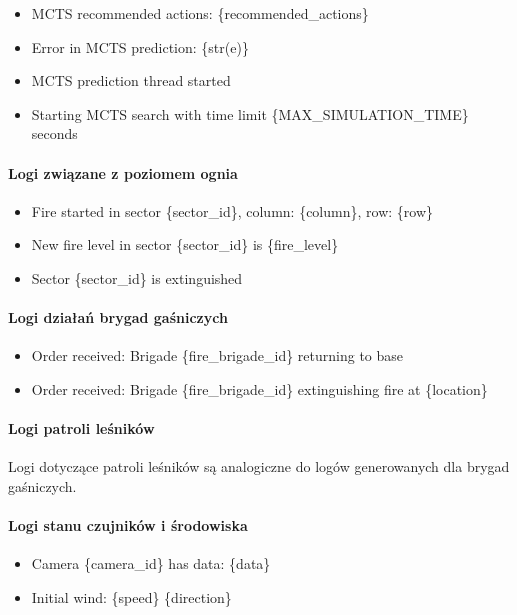 \documentclass[11pt,a4paper]{article}
\begin{document}
\begin{itemize}
    \item MCTS recommended actions: \{recommended\_actions\}
    \item Error in MCTS prediction: \{str(e)\}
    \item MCTS prediction thread started
    \item Starting MCTS search with time limit \{MAX\_SIMULATION\_TIME\} seconds
\end{itemize}

\paragraph{Logi związane z poziomem ognia}

\begin{itemize}
    \item Fire started in sector \{sector\_id\}, column: \{column\}, row: \{row\}
    \item New fire level in sector \{sector\_id\} is \{fire\_level\}
    \item Sector \{sector\_id\} is extinguished
\end{itemize}

\paragraph{Logi działań brygad gaśniczych}

\begin{itemize}
    \item Order received: Brigade \{fire\_brigade\_id\} returning to base
    \item Order received: Brigade \{fire\_brigade\_id\} extinguishing fire at \{location\}
\end{itemize}

\paragraph{Logi patroli leśników}

Logi dotyczące patroli leśników są analogiczne do logów generowanych dla brygad gaśniczych.

\paragraph{Logi stanu czujników i środowiska}

\begin{itemize}
    \item Camera \{camera\_id\} has data: \{data\}
    \item Initial wind: \{speed\} \{direction\}
\end{itemize}
\end{document}
